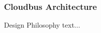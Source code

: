 \begin{frame}
	\frametitle{Cloudbus Architecture}
	\begin{block}{Design Philosophy}
		text...
	\end{block}
\end{frame}